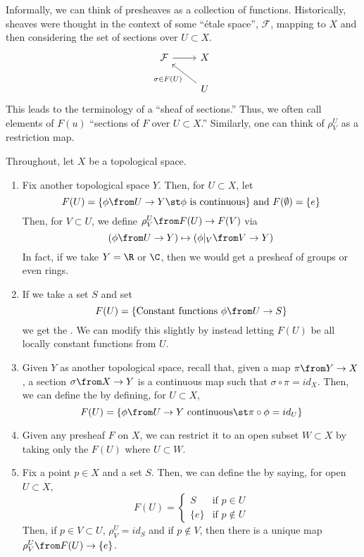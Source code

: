 \documentclass[11pt,leqno,oneside]{amsbook}
\renewcommand{\F}{F}
\newcommand{\cF}{\mathcal{F}}
\numberwithin{thm}{section}
\begin{document}
Informally, we can think of presheaves as a collection of
functions. Historically, sheaves were thought in the context of some
``\'{e}tale space'', \(\cF\), mapping to \(X\) and then considering
the set of sections over \(U \subset X\). \[ 
  \begin{tikzcd}
    \cF \ar[r] & X\\
    & \ar[ul, "\sigma \in \F(U)"] U
  \end{tikzcd}
\]
This leads to the terminology of a ``sheaf of sections.'' Thus, we
often call elements of \(\F(u)\) ``sections of \(\F\) over \(U \subset
X\).'' Similarly, one can think of \(\rho_V^U\) as a restriction map.
\begin{example}
  Throughout, let \(X\) be a topological space.
  \begin{enumerate}
  \item Fix another topological space \(Y\). Then, for \(U \subset
    X\), let \[
      F(U) = \{\phi \from U \to Y \st \phi \text{ is continuous} \}
      \text{ and } F(\emptyset) = \{e\} 
    \]
    Then, for \(V \subset U\), we define \(\rho_V^U \from F(U) \to
    F(V)\) via \[
      (\phi \from U \to Y) \mapsto (\phi |_V \from V \to Y)
    \]
    In fact, if we take \(Y=\R\) or \(\C\), then we would get a
    presheaf of groups or even rings.
  \item If we take a set \(S\) and set \[
      F(U) = \{\text{Constant functions }\phi \from U \to S\}
    \]
    we get the . We can modify this slightly by
    instead letting \(F(U)\) be all locally constant functions from
    \(U\).
  \item Given \(Y\) as another topological space, recall that, given a
    map \(\pi \from Y \to X\), a section \(\sigma \from X \to Y\) is a
    continuous map such that \(\sigma \circ \pi = id_X\). Then, we can
    define the  by defining, for
    \(U \subset X\), \[
      F(U) = \{\phi \from U \to Y \text{ continuous} \st \pi \circ
      \phi = id_U\}
    \]
  \item Given any presheaf \(F\) on \(X\), we can restrict it to an
    open subset \(W \subset X\) by taking only the \(F(U)\) where \(U
    \subset W\).
  \item Fix a point \(p \in X\) and a set \(S\). Then, we can define
    the  by saying, for open \(U \subset
    X\), \[
      F(U) =
      \begin{cases}
        S & \text{if }p \in U\\
        \{e\} & \text{if }p \not\in U
      \end{cases}
    \]
    Then, if \(p \in V \subset U\), \(\rho^U_V = id_S\) and if \(p
    \not \in V\), then there is a unique map \(\rho^U_V \from F(U) \to
    \{e\}\).
  \end{enumerate}
\end{example}
\end{document}
